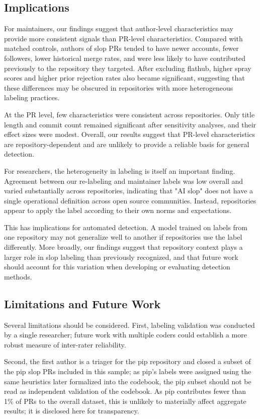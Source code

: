 \documentclass[11pt]{article}
\begin{document}
	\subsection{Implications}
	
	For maintainers, our findings suggest that author-level characteristics may provide more consistent signals than PR-level characteristics. Compared with matched controls, authors of slop PRs tended to have newer accounts, fewer followers, lower historical merge rates, and were less likely to have contributed previously to the repository they targeted. After excluding flathub, higher spray scores and higher prior rejection rates also became significant, suggesting that these differences may be obscured in repositories with more heterogeneous labeling practices.
	
	At the PR level, few characteristics were consistent across repositories. Only title length and commit count remained significant after sensitivity analyses, and their effect sizes were modest. Overall, our results suggest that PR-level characteristics are repository-dependent and are unlikely to provide a reliable basis for general detection.
	
	For researchers, the heterogeneity in labeling is itself an important finding. Agreement between our re-labeling and maintainer labels was low overall and varied substantially across repositories, indicating that "AI slop" does not have a single operational definition across open source communities. Instead, repositories appear to apply the label according to their own norms and expectations.
	
	This has implications for automated detection. A model trained on labels from one repository may not generalize well to another if repositories use the label differently. More broadly, our findings suggest that repository context plays a larger role in slop labeling than previously recognized, and that future work should account for this variation when developing or evaluating detection methods.
	
	\subsection{Limitations and Future Work}
	Several limitations should be considered. First, labeling validation was conducted by a single researcher; future work with multiple coders could establish a more robust measure of inter-rater reliability. 
	
	Second, the first author is a triager for the pip repository and closed a subset of the pip slop PRs included in this sample; as pip's labels were assigned using the same heuristics later formalized into the codebook, the pip subset should not be read as independent validation of the codebook. As pip contributes fewer than 1\% of PRs to the overall dataset, this is unlikely to materially affect aggregate results; it is disclosed here for transparency.
	
\end{document}
